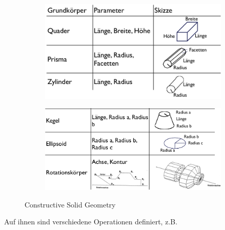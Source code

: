 \begin{figure}[h!]
	\centering
	\begin{subfigure}{.7\textwidth}
		\includegraphics[width=\textwidth]{figures/ch02_csg.png}
	\end{subfigure}
	\begin{subfigure}{.7\textwidth}
		\includegraphics[width=\textwidth]{figures/ch02_csg1.png}
	\end{subfigure}
	\caption{Constructive Solid Geometry}
	\label{fig:csg}
\end{figure}
Auf ihnen sind verschiedene Operationen definiert, z.B.
